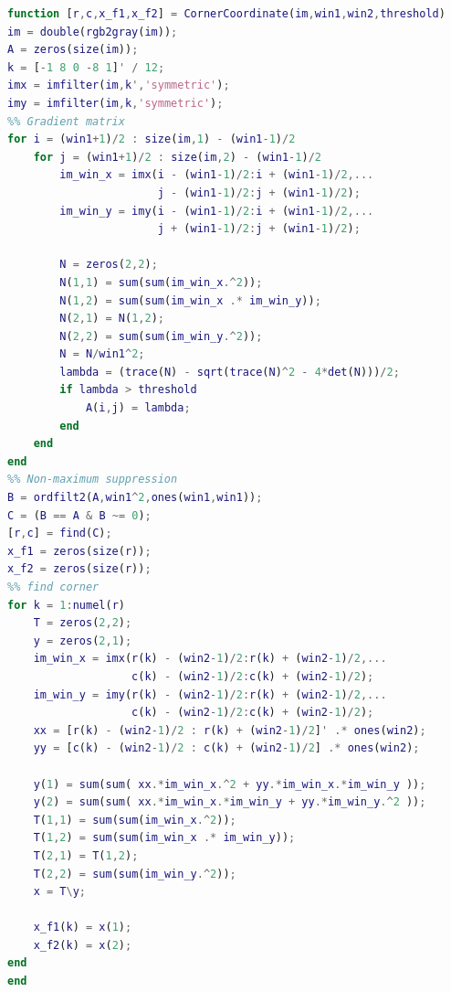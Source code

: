 \documentclass{assignment}
\begin{document}
\begin{lstlisting}[language=MATLAB]
function [r,c,x_f1,x_f2] = CornerCoordinate(im,win1,win2,threshold)
im = double(rgb2gray(im));
A = zeros(size(im));
k = [-1 8 0 -8 1]' / 12;
imx = imfilter(im,k','symmetric');
imy = imfilter(im,k,'symmetric');
%% Gradient matrix
for i = (win1+1)/2 : size(im,1) - (win1-1)/2
    for j = (win1+1)/2 : size(im,2) - (win1-1)/2
        im_win_x = imx(i - (win1-1)/2:i + (win1-1)/2,...
                       j - (win1-1)/2:j + (win1-1)/2);
        im_win_y = imy(i - (win1-1)/2:i + (win1-1)/2,...
                       j + (win1-1)/2:j + (win1-1)/2);

        N = zeros(2,2);
        N(1,1) = sum(sum(im_win_x.^2));
        N(1,2) = sum(sum(im_win_x .* im_win_y));
        N(2,1) = N(1,2);
        N(2,2) = sum(sum(im_win_y.^2));
        N = N/win1^2;
        lambda = (trace(N) - sqrt(trace(N)^2 - 4*det(N)))/2;
        if lambda > threshold
            A(i,j) = lambda;
        end
    end
end
%% Non-maximum suppression 
B = ordfilt2(A,win1^2,ones(win1,win1));
C = (B == A & B ~= 0);
[r,c] = find(C);
x_f1 = zeros(size(r));
x_f2 = zeros(size(r));
%% find corner
for k = 1:numel(r)
    T = zeros(2,2);
    y = zeros(2,1);
    im_win_x = imx(r(k) - (win2-1)/2:r(k) + (win2-1)/2,...
                   c(k) - (win2-1)/2:c(k) + (win2-1)/2);
    im_win_y = imy(r(k) - (win2-1)/2:r(k) + (win2-1)/2,...
                   c(k) - (win2-1)/2:c(k) + (win2-1)/2);
    xx = [r(k) - (win2-1)/2 : r(k) + (win2-1)/2]' .* ones(win2);
    yy = [c(k) - (win2-1)/2 : c(k) + (win2-1)/2] .* ones(win2);
    
    y(1) = sum(sum( xx.*im_win_x.^2 + yy.*im_win_x.*im_win_y ));
    y(2) = sum(sum( xx.*im_win_x.*im_win_y + yy.*im_win_y.^2 ));
    T(1,1) = sum(sum(im_win_x.^2));
    T(1,2) = sum(sum(im_win_x .* im_win_y));
    T(2,1) = T(1,2);
    T(2,2) = sum(sum(im_win_y.^2));
    x = T\y;
    
    x_f1(k) = x(1);
    x_f2(k) = x(2);
end
end
\end{lstlisting}
\end{document}

